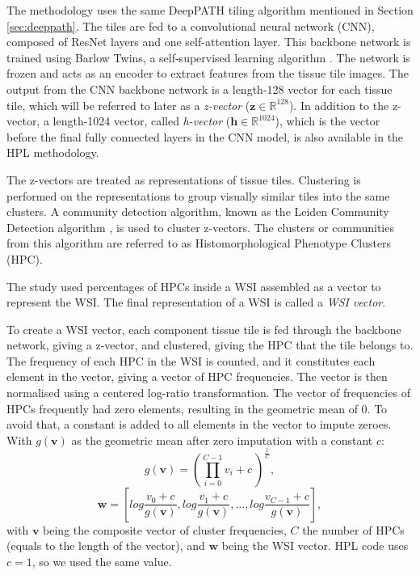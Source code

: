 \documentclass{l4proj}
\begin{document}
The methodology uses the same DeepPATH tiling algorithm mentioned in Section \ref{sec:deeppath}. The tiles are fed to a convolutional neural network (CNN), composed of ResNet layers \citep{resnet} and one self-attention layer. This backbone network is trained using Barlow Twins, a self-supervised learning algorithm \citep{zbontar2021}. The network is frozen and acts as an encoder to extract features from the tissue tile images. The output from the CNN backbone network is a length-128 vector for each tissue tile, which will be referred to later as a \emph{z-vector} ($\boldsymbol{z} \in \mathbb{R}^{128}$). In addition to the z-vector, a length-1024 vector, called \emph{h-vector} ($\boldsymbol{h} \in \mathbb{R}^{1024}$), which is the vector before the final fully connected layers in the CNN model, is also available in the HPL methodology.

The z-vectors are treated as representations of tissue tiles. Clustering is performed on the representations to group visually similar tiles into the same clusters. A community detection algorithm, known as the Leiden Community Detection algorithm \citep{Traag2019}, is used to cluster z-vectors. The clusters or communities from this algorithm are referred to as Histomorphological Phenotype Clusters (HPC).

The study used percentages of HPCs inside a WSI assembled as a vector to represent the WSI. The final representation of a WSI is called a \emph{WSI vector}.

To create a WSI vector, each component tissue tile is fed through the backbone network, giving a z-vector, and clustered, giving the HPC that the tile belongs to. The frequency of each HPC in the WSI is counted, and it constitutes each element in the vector, giving a vector of HPC frequencies. The vector is then normalised using a centered log-ratio transformation. The vector of frequencies of HPCs frequently had zero elements, resulting in the geometric mean of $0$. To avoid that, a constant is added to all elements in the vector to impute zeroes. With $g(\boldsymbol{v})$ as the geometric mean after zero imputation with a constant $c$:
\begin{equation}
    g(\boldsymbol{v}) = \left( \prod_{i=0}^{C-1} v_i + c\ \right)^\frac{1}{C} ,
\end{equation}
\begin{equation}
    \boldsymbol{w} = \left[log\frac{v_0 + c}{g(\boldsymbol{v})},log\frac{v_1 + c}{g(\boldsymbol{v})},\dots,log\frac{v_{C-1} + c}{g(\boldsymbol{v})}\right],
\end{equation}
with $\boldsymbol{v}$ being the composite vector of cluster frequencies, $C$ the number of HPCs (equals to the length of the vector), and $\boldsymbol{w}$ being the WSI vector. HPL code uses $c = 1$, so we used the same value.
\end{document}
